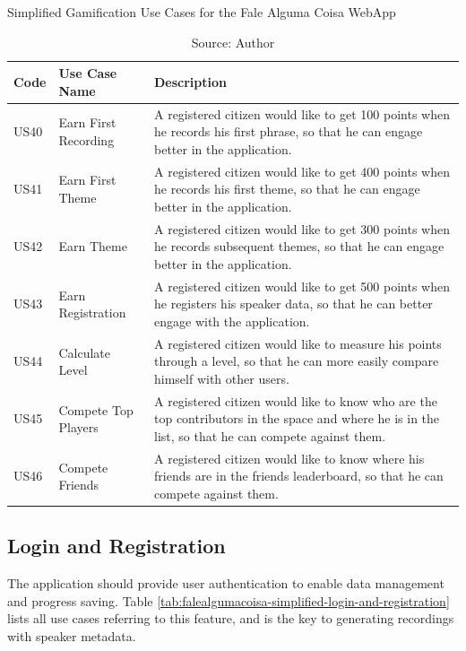 \begin{table}[h]
\caption{Simplified Gamification Use Cases for the Fale Alguma Coisa WebApp}
\label{tab:falealgumacoisa-simplified-gamification}
\centering
\begin{tabular}{|p{1cm}|p{3cm}|p{10cm}|}
\hline
    Code & Use Case Name & Description \\ \hline
    US40 & Earn First Recording & A registered citizen would like to get 100 points when he records his first phrase, so that he can engage better in the application. \\ \hline
    US41 & Earn First Theme & A registered citizen would like to get 400 points when he records his first theme, so that he can engage better in the application. \\ \hline
    US42 & Earn Theme & A registered citizen would like to get 300 points when he records subsequent themes, so that he can engage better in the application. \\ \hline
    US43 & Earn Registration & A registered citizen would like to get 500 points when he registers his speaker data, so that he can better engage with the application. \\ \hline
    US44 & Calculate Level & A registered citizen would like to measure his points through a level, so that he can more easily compare himself with other users. \\ \hline
    US45 & Compete Top Players & A registered citizen would like to know who are the top contributors in the space and where he is in the list, so that he can compete against them. \\ \hline
    US46 & Compete Friends & A registered citizen would like to know where his friends are in the friends leaderboard, so that he can compete against them. \\ \hline
\end{tabular}
\caption*{Source: Author}
\end{table}

\subsection{Login and Registration}

The application should provide user authentication to enable data management and progress saving. Table \ref{tab:falealgumacoisa-simplified-login-and-registration} lists all use cases referring to this feature, and is the key to generating recordings with speaker metadata.


